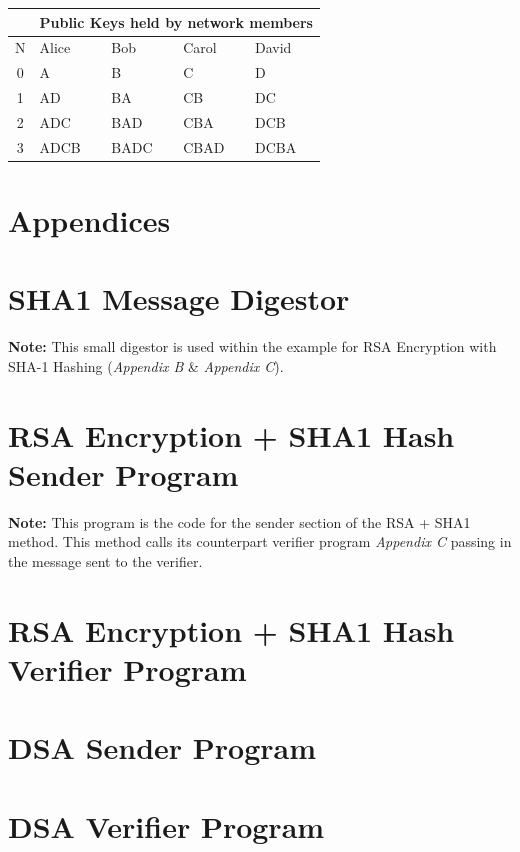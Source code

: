 \documentclass[a4paper, twoside, 11pt]{article}
\begin{document}
\begin{center}
	\begin{tabular}{ |c|l|l|l|l| } 
	 \hline
	 \multicolumn{1}{|c|}{}& \multicolumn {4}{|c|}{Public Keys held by network members} \\
	 \hline
   N & Alice & Bob & Carol & David \\
   \hline
   0 & A & B & C & D \\
   1 & AD & BA & CB & DC \\
   2 & ADC & BAD & CBA & DCB \\
   3 & ADCB & BADC & CBAD & DCBA \\
	 \hline
  \end{tabular}
\end{center}

\newpage
\section*{Appendices}
\appendix
\section{SHA1 Message Digestor}
\textbf{Note:} This small digestor is used within the example for RSA Encryption with SHA-1 Hashing (\textit{Appendix B} \& \textit{Appendix C}).

\newpage
\section{RSA Encryption + SHA1 Hash Sender Program}
\textbf{Note:} This program is the code for the sender section of the RSA + SHA1 method. This method calls its counterpart verifier program \textit{Appendix C} passing in the message sent to the verifier.

\newpage
\section{RSA Encryption + SHA1 Hash Verifier Program}

\newpage
\section{DSA Sender Program}

\newpage
\section{DSA Verifier Program}

\newpage
\end{document}
